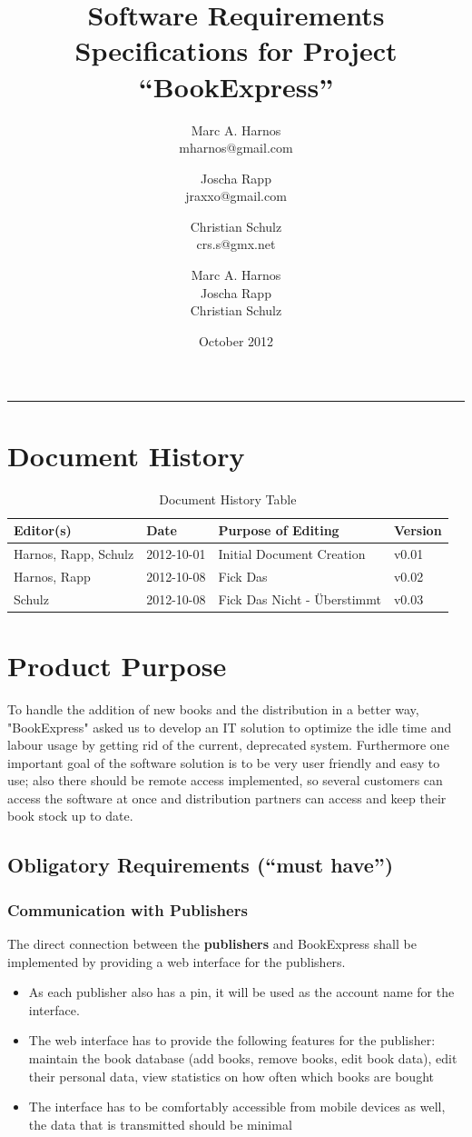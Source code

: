 \documentclass[11pt,a4paper,oneside,svgnames]{report}
\title{Software Requirements Specifications for Project ``BookExpress''}
\author{Marc A. Harnos\\ {mharnos@gmail.com} \and Joscha Rapp\\ {jraxxo@gmail.com} \and Christian Schulz\\ {crs.s@gmx.net}}
\author{Marc A. Harnos\\ Joscha Rapp\\ Christian Schulz}
\date{October 2012}
\makeatletter
\renewcommand{\maketitle}{\begin{titlepage}%
    \let\footnotesize\small
    \let\footnoterule\relax
    \parindent \z@
    \reset@font
    \null\vfil
    \begin{flushleft}
      \huge \@title
    \end{flushleft}
    \par
    \hrule height 4pt
    \par
    \begin{flushright}
      \LARGE \@author \par
    \end{flushright}
    \vskip 60\p@
    \vfil\null
  \end{titlepage}%
  \setcounter{footnote}{0}%
}
\makeatother
\begin{document}
\maketitle
\tableofcontents

\chapter*{Document History}

\begin{table}[H]
\centering
\begin{tabular}{|l|l|l|l|}
\hline 
Editor(s) & Date & Purpose of Editing & Version \\ 
\hline 
Harnos, Rapp, Schulz & 2012-10-01 & Initial Document Creation & v0.01 \\ 
\hline
Harnos, Rapp & 2012-10-08 & Fick Das & v0.02 \\ 
\hline
Schulz & 2012-10-08 & Fick Das Nicht - Überstimmt & v0.03 \\ 
\hline 
\end{tabular}
\caption{Document History Table}
\label{tab:document-history}
\end{table}


\chapter{Product Purpose}
To handle the addition of new books and the distribution in a better way, "BookExpress" asked us to develop an IT solution to optimize the idle time and labour usage by getting rid of the current, deprecated system. Furthermore one important goal of the software solution is to be very user friendly and easy to use; also there should be remote access implemented, so several customers can access the software at once and distribution partners can access and keep their book stock up to date.
\section{Obligatory Requirements (``must have'')}
\subsection{Communication with Publishers}
The direct connection between the \textbf{publishers} and BookExpress shall be implemented by providing a web interface for the publishers.\\
\begin{itemize}
\item As each publisher also has a \gls{pin}, it will be used as the account name for the interface.
\item The web interface has to provide the following features for the publisher: maintain the book database (add books, remove books, edit book data), edit their personal data, view statistics on how often which books are bought
\item The interface has to be comfortably accessible from mobile devices as well, the data that is transmitted should be minimal\\
\end{itemize}
\end{document}
